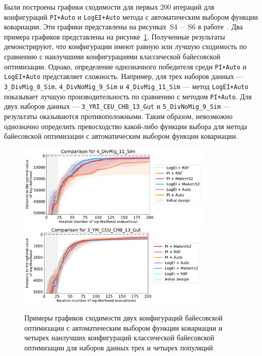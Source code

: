 Были построены графики сходимости для первых 200 итераций для конфигураций \texttt{PI+Auto} и \texttt{LogEI+Auto} метода с автоматическим выбором функции ковариации.
Эти графики представлены на рисунках~S4~--~S6 в работе~\cite{noskova2023bayesian}.
Два примера графиков представлены на рисунке~\ref{fig:part2:bo_hpo:bo_auto}.
Полученные результаты демонстрируют, что конфигурации имеют равную или лучшую сходимость по сравнению с наилучшими конфигурациями классической байесовской оптимизации.
Однако, определение однозначного победителя среди \texttt{PI+Auto} и \texttt{LogEI+Auto} представляет сложность.
Например, для трех наборов данных --- \texttt{3\_DivMig\_8\_Sim}, \texttt{4\_DivNoMig\_9\_Sim} и \texttt{4\_DivMig\_11\_Sim} --- метод \texttt{LogEI+Auto} показывает лучшую производительность по сравнению с методом \texttt{PI+Auto}.
Для двух наборов данных --- \texttt{3\_YRI\_CEU\_CHB\_13\_Gut} и \texttt{5\_DivNoMig\_9\_Sim} --- результаты оказываются противоположными.
Таким образом, невозможно однозначно определить превосходство какой-либо функции выбора для метода байесовской оптимизации с автоматическим выбором функции ковариации.

\begin{figure}
    \centering
        \includegraphics[height=4.0cm]{images_experiments/bo_hpo/BO_auto/4_DivMig_11_Sim_bo_auto.pdf}
        \includegraphics[height=4.0cm]{images_experiments/bo_hpo/BO_auto/3_YRI_CEU_CHB_13_Gut_bo_auto.pdf}
    \caption{Примеры графиков сходимости двух конфигураций байесовской оптимизации с автоматическим выбором функции ковариации и четырех наилучших конфигураций классической байесовской оптимизации для наборов данных трех и четырех популяций}
    \label{fig:part2:bo_hpo:bo_auto}
\end{figure}

